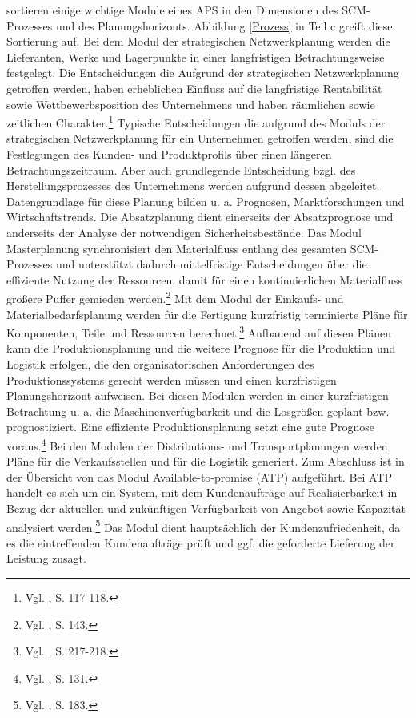 \cite{meyr2015structure} sortieren einige wichtige Module eines APS in den Dimensionen des SCM-Prozesses und des Planungshorizonts. Abbildung \ref{Prozess} in Teil c greift diese Sortierung auf. Bei dem Modul der strategischen Netzwerkplanung werden die Lieferanten, Werke und Lagerpunkte in einer langfristigen Betrachtungsweise festgelegt. Die Entscheidungen die Aufgrund der strategischen Netzwerkplanung getroffen werden, haben erheblichen Einfluss auf die langfristige Rentabilität sowie Wettbewerbsposition des Unternehmens und haben räumlichen sowie zeitlichen Charakter.\footnote{Vgl. \cite{goetschalckx2005strategic}, S. 117-118.} Typische Entscheidungen die aufgrund des Moduls der strategischen Netzwerkplanung für ein Unternehmen getroffen werden, sind die Festlegungen des Kunden- und Produktprofils über einen längeren Betrachtungszeitraum. Aber auch grundlegende Entscheidung bzgl. des Herstellungsprozesses des Unternehmens werden aufgrund dessen abgeleitet. Datengrundlage für diese Planung bilden u. a. Prognosen, Marktforschungen und Wirtschaftstrends.
Die Absatzplanung dient einerseits der Absatzprognose und anderseits der Analyse der notwendigen Sicherheitsbestände. Das Modul Masterplanung synchronisiert den Materialfluss entlang des gesamten SCM-Prozesses und unterstützt dadurch mittelfristige Entscheidungen über die effiziente Nutzung der Ressourcen, damit für einen kontinuierlichen Materialfluss größere Puffer gemieden werden.\footnote{Vgl. \cite{rohde2002scm}, S. 143.} Mit dem Modul der Einkaufs- und Materialbedarfsplanung werden für die Fertigung kurzfristig terminierte Pläne für Komponenten, Teile und Ressourcen berechnet.\footnote{Vgl. \cite{stadler2008aps}, S. 217-218.} Aufbauend auf diesen Plänen kann die Produktionsplanung und die weitere Prognose für die Produktion und Logistik erfolgen, die den organisatorischen Anforderungen des Produktionssystems gerecht werden müssen und einen kurzfristigen Planungshorizont aufweisen. Bei diesen Modulen werden in einer kurzfristigen Betrachtung u. a. die Maschinenverfügbarkeit und die Losgrößen geplant bzw. prognostiziert. Eine effiziente Produktionsplanung setzt eine gute Prognose voraus.\footnote{Vgl. \cite{dickersback2004pp}, S. 131.} Bei den Modulen der Distributions- und Transportplanungen werden Pläne für die Verkaufsstellen und für die Logistik generiert. Zum Abschluss ist in der Übersicht von \cite{meyr2015structure} das Modul Available-to-promise (ATP) aufgeführt. Bei ATP handelt es sich um ein System, mit dem Kundenaufträge auf Realisierbarkeit in Bezug der aktuellen und zukünftigen Verfügbarkeit von Angebot sowie Kapazität analysiert werden.\footnote{Vgl. \cite{Stadtler:2008aa}, S. 183.} Das Modul dient hauptsächlich der Kundenzufriedenheit, da es die eintreffenden Kundenaufträge prüft und ggf. die geforderte Lieferung der Leistung zusagt.

